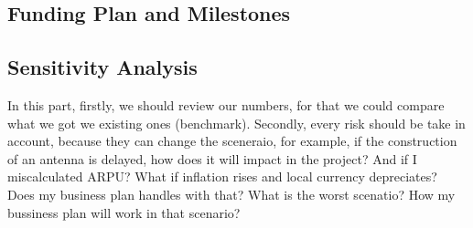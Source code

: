 \documentclass[a4paper,11pt]{article}
\begin{document}
\subsection{Funding Plan and Milestones}


\subsection{Sensitivity Analysis}
In this part, firstly, we should review our numbers, for that we could compare what we
got we existing ones (benchmark). Secondly, every risk should be take in account,
because they  can change the sceneraio,  for example, if the  construction of an
antenna  is  delayed,  how  does  it  will  impact in  the  project?  And  if  I
miscalculated ARPU? What if inflation rises and local currency depreciates? Does
my business plan handles with that?
What is the worst scenatio? How my bussiness plan will work in that scenario?
\end{document}
